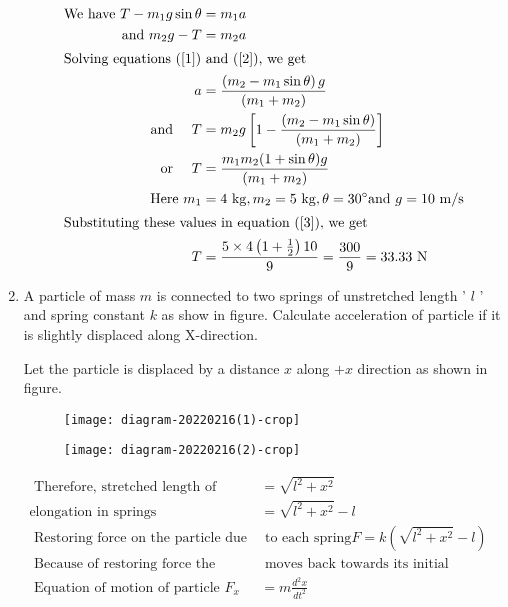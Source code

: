 \begin{enumerate}
\begin{answer}
\begin{figure}[H]
			\end{figure}
		\begin{align}
\text{We have }T-m_{1} g \sin \theta&=m_{1} a \label{1} \\
\text{ and }m_{2} g-T&=m_{2} a \label{2}\\
\intertext{Solving equations (\ref{1}) and (\ref{2}), we get}
a&=\frac{\left(m_{2}-m_{1} \sin \theta\right) g}{\left(m_{1}+m_{2}\right)}\label{3}\\
\text { and } \quad T & =m_{2} g\left[1-\frac{\left(m_{2}-m_{1} \sin \theta\right)}{\left(m_{1}+m_{2}\right)}\right] \notag\\
 \text { or } \quad T & =\frac{m_{1} m_{2}(1+\sin \theta) g}{\left(m_{1}+m_{2}\right)}\\
 \text{Here }m_{1}&=4 \mathrm{~kg}, m_{2}=5 \mathrm{~kg}, \theta=30^{\circ} \text{and }g=10 \mathrm{~m} / \mathrm{s}\notag\\
  \intertext{Substituting these values in equation (\ref{3}), we get}
 T&=\frac{5 \times 4\left(1+\frac{1}{2}\right) 10}{9}=\frac{300}{9}=33.33 \mathrm{~N}\notag
\end{align}
	\end{answer}
	\item A particle of mass $m$ is connected to two springs of unstretched length ' $l$ ' and spring constant $k$ as show in figure. Calculate acceleration of particle if it is slightly displaced along X-direction.
	\begin{answer}
			Let the particle is displaced by a distance $x$ along $+x$ direction as shown in figure.
			\begin{figure}[H]
				\centering
				\texttt{[image: diagram-20220216(1)-crop]}
			\end{figure}
		\begin{figure}[H]
			\centering
			\texttt{[image: diagram-20220216(2)-crop]}
		\end{figure}
		\begin{align*}
	\text{	Therefore, stretched length of spring }&=\sqrt{l^{2}+x^{2}}\\
		\text{elongation in springs }&=\sqrt{l^{2}+x^{2}}-l\\
	\text{	Restoring force on the particle due}&\text{  to each spring}
	 F=k\left(\sqrt{l^{2}+x^{2}}-l\right)\\
	\text{ Because of restoring force the particle}&\text{ moves back towards its initial position.}\\
\text{	Equation of motion of particle }F_{x}&=m \frac{d^{2} x}{d t^{2}}\\

\end{align*}
\end{answer}
\end{enumerate}
